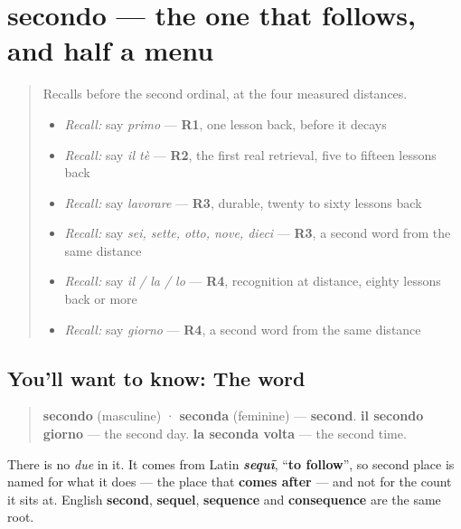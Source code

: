 \section[secondo / seconda]{secondo — the one that follows, and half a menu}

\label{lesson:IT-C26-secondo}



\begin{quote}
Recalls before the second ordinal, at the four measured distances.

\begin{itemize}
\raggedright
  \item \emph{Recall:} say \emph{primo} — \textbf{R1}, one lesson back, before it decays
  \item \emph{Recall:} say \emph{il tè} — \textbf{R2}, the first real retrieval, five to fifteen lessons back
  \item \emph{Recall:} say \emph{lavorare} — \textbf{R3}, durable, twenty to sixty lessons back
  \item \emph{Recall:} say \emph{sei, sette, otto, nove, dieci} — \textbf{R3}, a second word from the same distance
  \item \emph{Recall:} say \emph{il / la / lo} — \textbf{R4}, recognition at distance, eighty lessons back or more
  \item \emph{Recall:} say \emph{giorno} — \textbf{R4}, a second word from the same distance
\end{itemize}
\end{quote}

\subsection*{You'll want to know: The word}
\begin{quote}
\textbf{secondo} (masculine) · \textbf{seconda} (feminine) — \textbf{second}. \textbf{il secondo giorno} — the second day. \textbf{la seconda volta} — the second time.
\end{quote}

There is no \emph{due} in it. It comes from Latin \emph{\textbf{sequī}}, \textquotedblleft{}\textbf{to follow}\textquotedblright{}, so second place is named for what it does — the place that \textbf{comes after} — and not for the count it sits at. English \textbf{second}, \textbf{sequel}, \textbf{sequence} and \textbf{consequence} are the same root.

